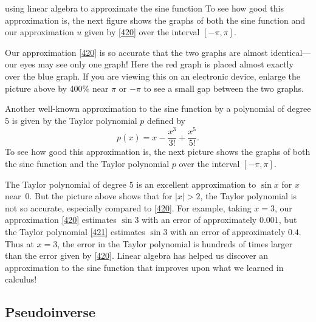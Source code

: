 \begin{example}{using linear algebra to approximate the sine function}
To see how good this approximation is, the next figure shows the graphs of both the sine function and our approximation $u$ given by \ref{420} over the interval $[-\pi, \pi]$.


Our approximation \ref{420} is so accurate that the two
graphs are almost identical---our eyes may see only one graph! Here the red graph is placed almost exactly over the blue graph. If you are viewing this on an electronic device, enlarge the picture above by 400\% near $\pi$ or $-\pi$ to see a small gap between the two graphs.

Another well-known approximation to the sine function by a polynomial of degree $5$ is given by the Taylor  polynomial $p$ defined by
\begin{equation} \label{421}
p(x) = x - \frac{x^3}{3!}  + \frac{x^5}{5!}.
\end{equation}%
To see how good this approximation is, the next picture shows the graphs of both the sine function and the Taylor
polynomial $p$ over the interval $[-\pi, \pi]$.


The Taylor polynomial of degree $5$ is an excellent approximation to $\sin x$ for $x$ near~$0$.  But the picture above shows that for $|x| > 2$, the Taylor polynomial is not so accurate, especially compared to \ref{420}.  For example, taking $x = 3$, our approximation \ref{420} estimates $\sin 3$ with an error of approximately $0.001$, but the Taylor polynomial \ref{421} estimates $\sin 3$ with an error of approximately $0.4$. Thus at $x = 3$, the error in the Taylor polynomial is hundreds of times larger than the error given by \ref{420}.  Linear algebra has helped us discover an approximation to the sine function that improves upon what we learned in calculus!
\end{example}

\subsection{Pseudoinverse}

